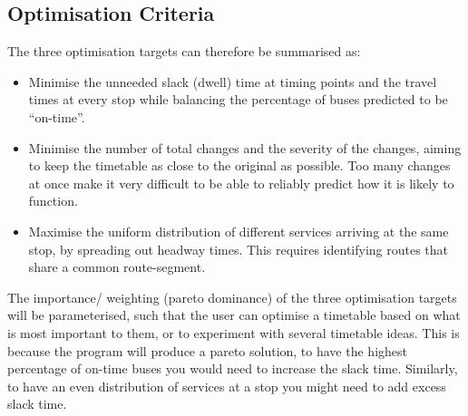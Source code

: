 \documentclass{article}
\begin{document}
\subsection{Optimisation Criteria}
The three optimisation targets can therefore be summarised as:
\begin{itemize}
	\item Minimise the unneeded slack (dwell) time at timing points and the travel times at every stop while balancing the percentage of buses predicted to be ``on-time''.  
	\item Minimise the number of total changes and the severity of the changes, aiming to keep the timetable as close to the original as possible. Too many changes at once make it very difficult to be able to reliably predict how it is likely to function. 
	\item Maximise the uniform distribution of different services arriving at the same stop, by spreading out headway times. This requires identifying routes that share a common route-segment.
\end{itemize}
 
 The importance/ weighting (pareto dominance) of the three optimisation targets will be parameterised, such that the user can optimise a timetable based on what is most important to them, or to experiment with several timetable ideas. This is because the program will produce a pareto solution, to have the highest percentage of on-time buses you would need to increase the slack time. Similarly, to have an even distribution of services at a stop you might need to add excess slack time.
 
 
\end{document}
